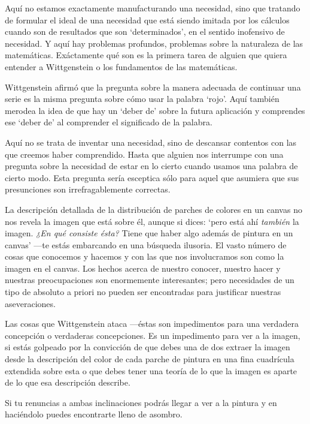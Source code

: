    Aquí no estamos exactamente manufacturando una necesidad, sino que tratando
   de formular el ideal de una necesidad que está siendo imitada por los
   cálculos cuando son de resultados que son `determinados', en el sentido
   inofensivo de necesidad. Y aquí hay problemas profundos, problemas sobre la
   naturaleza de las matemáticas. Exáctamente qué son es la primera tarea de
   alguien que quiera entender a Wittgenstein o los fundamentos de las
   matemáticas.

   Wittgenstein afirmó que la pregunta sobre la manera adecuada de continuar una
   serie es la misma pregunta sobre cómo usar la palabra `rojo'. Aquí también
   merodea la idea de que hay un `deber de' sobre la futura aplicación y
   comprendes ese `deber de' al comprender el significado de la palabra.

   Aquí no se trata de inventar una necesidad, sino de descansar contentos con
   las que creemos haber comprendido. Hasta que alguien nos interrumpe con una
   pregunta sobre la necesidad de estar en lo cierto cuando usamos una palabra
   de cierto modo. Esta pregunta sería esceptica sólo para aquel que asumiera
   que sus presunciones son irrefragablemente correctas.

   La descripción detallada de la distribución de parches de colores en un
   canvas no nos revela la imagen que está sobre él, aunque si dices: `pero está
   ahí \emph{también} la imagen. \emph{¿En qué consiste ésta?} Tiene que haber
   algo además de pintura en un canvas' ---te estás embarcando en una búsqueda
   ilusoria. El vasto número de cosas que conocemos y hacemos y con las que nos
   involucramos son como la imagen en el canvas. Los hechos acerca de nuestro
   conocer, nuestro hacer y nuestras preocupaciones son enormemente
   interesantes; pero necesidades de un tipo de absoluto a priori no pueden ser
   encontradas para justificar nuestras aseveraciones.

   Las cosas que Wittgenstein ataca ---éstas son impedimentos para una verdadera
   concepción o verdaderas concepciones. Es un impedimento para ver a la imagen,
   si estás golpeado por la convicción de que debes una de dos extraer la imagen
   desde la descripción del color de cada parche de pintura en una fina
   cuadrícula extendida sobre esta o que debes tener una teoría de lo que la
   imagen es aparte de lo que esa descripción describe.

   Si tu renuncias a ambas inclinaciones podrás llegar a ver a la pintura y en
   haciéndolo puedes encontrarte lleno de asombro.

